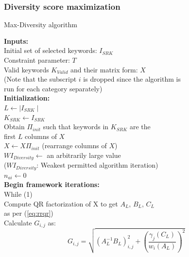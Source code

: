 \subsubsection{Diversity score maximization}
\label{sec:aaodivmax}
\begin{algorithm}
\fontsize{8pt}{1em}\selectfont
\caption{Max-Diversity algorithm }
\label{algo:maxdiversity}
\textbf{Inputs:}  \\ 
\hspace*{2mm}   Initial set of selected keywords: $I_{SRK}$ \\ 
\hspace*{2mm}   Constraint parameter: $T$ \\ 
\hspace*{2mm}   Valid keywords $K_{Valid}$ and their matrix form: $X$ \\ 
\hspace*{2mm}   (Note that the subscript $i$ is dropped since the algorithm is  \\ 
\hspace*{2mm}   run for each category separately) \\ 
\textbf{Initialization:} \\ 
\hspace*{2mm}   $L \leftarrow \mid I_{SRK} \mid$ \\ 
\hspace*{2mm}   $K_{SRK} \leftarrow I_{SRK} $ \\   
\hspace*{2mm}   Obtain $\Pi_{init}$ such that keywords in $K_{SRK}$ are the \\
\hspace*{2mm}   first $L$ columns of $X$ \\ 
\hspace*{2mm}   $X \leftarrow X \Pi_{init} $ (rearrange columns of $X$)  \\ 
\hspace*{2mm}   $WI_{Diversity} \leftarrow $ an arbitrarily large value \\ 
\hspace*{2mm}   ($WI_{Diversity}$: Weakest permitted algorithm iteration) \\ 
\hspace*{2mm}   $n_{ai} \leftarrow 0$ \\ 
\textbf{Begin framework iterations: } \\ 
\hspace*{2mm}   While (1) 		 \\ 
\hspace*{6mm}        Compute QR factorization of X to get $A_L$, $B_L$, $C_L$ \\ 
\hspace*{6mm}        as per (\ref{eq:rrqr})  \\ 
\hspace*{6mm}        Calculate $G_{i,j}$ as: 
\begin{equation}
G_{i,j} = \sqrt{  ( A_L^{-1} B_L )^2 _{i,j}   + (\frac{\gamma_j(C_L)}{w_i(A_L)}  )^2 } 
\end{equation}


\end{algorithm}
